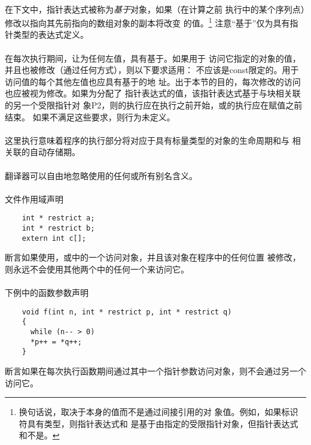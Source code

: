 {\paragraph{}
在下文中，指针表达式被称为\textit{基于}对象，如果（在计算之前
执行中的某个序列点）修改以指向其先前指向的数组对象的副本将改变
的值。\footnote{换句话说，取决于本身的值而不是通过间接引用的对
象值。例如，如果标识符具有类型，则指针表达式和
是基于由指定的受限指针对象，但指针表达式和不是。}
注意``基于''仅为具有指针类型的表达式定义。

\paragraph{}
在每次执行期间，让为任何左值，具有基于。如果用于
访问它指定的对象的值，并且也被修改（通过任何方式），则以下要求适用：
不应该是const限定的。用于访问值的每个其他左值也应具有基于的地
址。出于本节的目的，每次修改的访问也应被视为修改。如果为分配了
指针表达式的值，该指针表达式基于与块相关联的另一个受限指针对
象{P2}，则的执行应在执行之前开始，或的执行应在赋值之前结束。
如果不满足这些要求，则行为未定义。

\paragraph{}
这里执行意味着程序的执行部分将对应于具有标量类型的对象的生命周期和与
相关联的自动存储期。

\paragraph{}
翻译器可以自由地忽略使用的任何或所有别名含义。

\paragraph{}
\ex 文件作用域声明
\begin{lstlisting}
    int * restrict a;
    int * restrict b;
    extern int c[];
\end{lstlisting}
断言如果使用，或中的一个访问对象，并且该对象在程序中的任何位置
被修改，则永远不会使用其他两个中的任何一个来访问它。

\paragraph{}
\ex 下例中的函数参数声明
\begin{lstlisting}
    void f(int n, int * restrict p, int * restrict q)
    {
      while (n-- > 0)
      *p++ = *q++;
    }
\end{lstlisting}
断言如果在每次执行函数期间通过其中一个指针参数访问对象，则不会通过另一个访问它。

}
